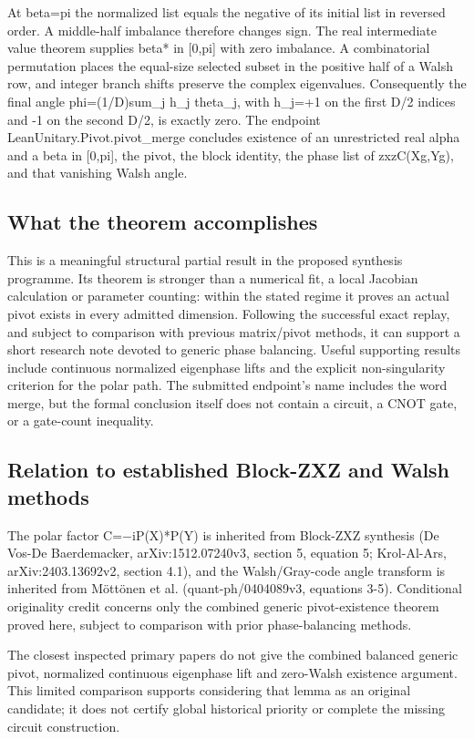 \documentclass[11pt,a4paper]{article}
\begin{document}
At beta=pi the normalized list equals the negative of its initial list in reversed order. A middle-half imbalance therefore changes sign. The real intermediate value theorem supplies beta* in [0,pi] with zero imbalance. A combinatorial permutation places the equal-size selected subset in the positive half of a Walsh row, and integer branch shifts preserve the complex eigenvalues. Consequently the final angle phi=(1/D)sum\_j h\_j theta\_j, with h\_j=+1 on the first D/2 indices and -1 on the second D/2, is exactly zero. The endpoint LeanUnitary.Pivot.pivot\_merge concludes existence of an unrestricted real alpha and a beta in [0,pi], the pivot, the block identity, the phase list of zxzC(Xg,Yg), and that vanishing Walsh angle.

\subsection{What the theorem accomplishes}
This is a meaningful structural partial result in the proposed synthesis programme. Its theorem is stronger than a numerical fit, a local Jacobian calculation or parameter counting: within the stated regime it proves an actual pivot exists in every admitted dimension. Following the successful exact replay, and subject to comparison with previous matrix/pivot methods, it can support a short research note devoted to generic phase balancing. Useful supporting results include continuous normalized eigenphase lifts and the explicit non-singularity criterion for the polar path. The submitted endpoint's name includes the word merge, but the formal conclusion itself does not contain a circuit, a CNOT gate, or a gate-count inequality.

\subsection{Relation to established Block-ZXZ and Walsh methods}
The polar factor C=\ensuremath{-}iP(X)*P(Y) is inherited from Block-ZXZ synthesis (De Vos-De Baerdemacker, arXiv:1512.07240v3, section 5, equation 5; Krol-Al-Ars, arXiv:2403.13692v2, section 4.1), and the Walsh/Gray-code angle transform is inherited from Möttönen et al. (quant-ph/0404089v3, equations 3-5). Conditional originality credit concerns only the combined generic pivot-existence theorem proved here, subject to comparison with prior phase-balancing methods.

The closest inspected primary papers do not give the combined balanced generic pivot, normalized continuous eigenphase lift and zero-Walsh existence argument. This limited comparison supports considering that lemma as an original candidate; it does not certify global historical priority or complete the missing circuit construction.
\end{document}
